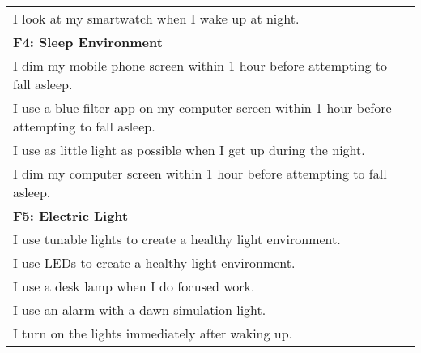 \documentclass[
  english,
  man,floatsintext]{apa6}
\begin{document}
\begin{longtable}[]{@{}
  >{\raggedright\arraybackslash}p{}@{}}
I look at my smartwatch when I wake up at night. \\
\textbf{F4: Sleep Environment} \\
I dim my mobile phone screen within 1 hour before attempting to fall asleep. \\
I use a blue-filter app on my computer screen within 1 hour before attempting to fall asleep. \\
I use as little light as possible when I get up during the night. \\
I dim my computer screen within 1 hour before attempting to fall asleep. \\
\textbf{F5: Electric Light} \\
I use tunable lights to create a healthy light environment. \\
I use LEDs to create a healthy light environment. \\
I use a desk lamp when I do focused work. \\
I use an alarm with a dawn simulation light. \\
I turn on the lights immediately after waking up. \\
\bottomrule
\end{longtable}

\newpage
\end{document}
